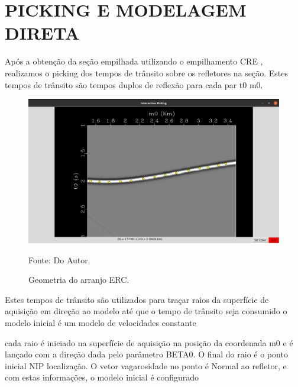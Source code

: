 \chapter{PICKING E MODELAGEM DIRETA}
\label{cap2}

Após a obtenção da seção empilhada utilizando o empilhamento CRE \cite{relatorio}, realizamos o picking dos tempos de trânsito sobre os refletores na seção. Estes tempos de trânsito são tempos duplos de reflexão para cada par t0 m0.

\begin{figure}[H]
\caption{Geometria do arranjo ERC.}
\begin{center}
\includegraphics[scale=0.3]{images/picking.png}
\vspace{-0.3cm}
\end{center}
\begin{center}
 Fonte: Do Autor.
\end{center}
\label{fig:2.1}
\end{figure}

Estes tempos de trânsito são utilizados para traçar raios da superfície de aquisição em direção ao modelo
até que o tempo de trânsito seja consumido
o modelo inicial é um modelo de velocidades constante

cada raio é iniciado na superfície de aquisição na posição da coordenada m0 e é lançado com a direção dada
pelo parâmetro BETA0. O final do raio é o ponto inicial NIP localização. O vetor vagarosidade no ponto é
Normal ao refletor, e com estas informações, o modelo inicial é configurado \cite{niptomo}

